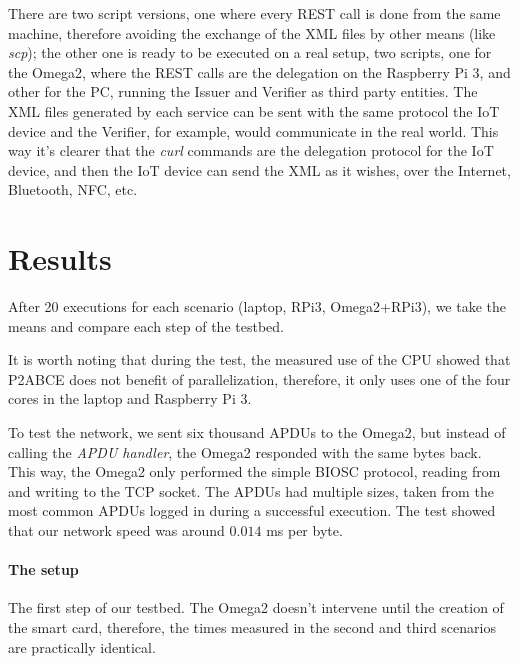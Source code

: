 There are two script versions, one where every REST call is done from the same machine, therefore avoiding the exchange of the XML files by other means (like \textit{scp}); the other one is ready to be executed on a real setup, two scripts, one for the Omega2, where the REST calls are the delegation on the Raspberry Pi 3, and other for the PC, running the Issuer and Verifier as third party entities. The XML files generated by each service can be sent with the same protocol the IoT device and the Verifier, for example, would communicate in the real world. This way it's clearer that the \textit{curl} commands are the delegation protocol for the IoT device, and then the IoT device can send the XML as it wishes, over the Internet, Bluetooth, NFC, etc.


\section{Results}

After 20 executions for each scenario (laptop, RPi3, Omega2+RPi3), we take the means and compare each step of the testbed.

It is worth noting that during the test, the measured use of the CPU showed that P2ABCE does not benefit of parallelization, therefore, it only uses one of the four cores in the laptop and Raspberry Pi 3.

To test the network, we sent six thousand APDUs to the Omega2, but instead of calling the \textit{APDU handler}, the Omega2 responded with the same bytes back. This way, the Omega2 only performed the simple BIOSC protocol, reading from and writing to the TCP socket.
The APDUs had multiple sizes, taken from the most common APDUs logged in during a successful execution. The test showed that our network speed was around $0.014$ ms per byte.


\paragraph{The setup}\hfil

The first step of our testbed. The Omega2 doesn't intervene until the creation of the smart card, therefore, the times measured in the second and third scenarios are practically identical.

